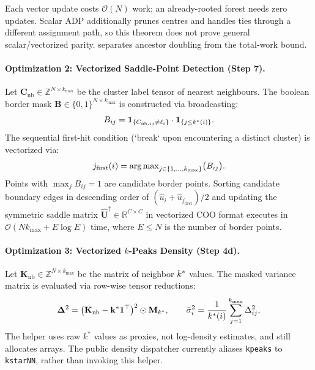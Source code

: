 Each vector update costs $\mathcal O(N)$ work; an already-rooted forest
needs zero updates. Scalar ADP additionally prunes centres and handles
ties through a different assignment path, so this theorem does not prove
general scalar/vectorized parity.  separates
ancestor doubling from the total-work bound.

\paragraph{Optimization 2: Vectorized Saddle-Point Detection (Step 7).}
Let $\mathbf{C}_{\mathrm{nb}} \in \mathbb{Z}^{N \times k_{\max}}$ be
the cluster label tensor of nearest neighbours. The boolean border
mask $\mathbf{B} \in \{0, 1\}^{N \times k_{\max}}$ is constructed
via broadcasting:
\begin{equation}
  B_{ij} = \mathbf{1}_{\{C_{\mathrm{nb}, ij} \ne \ell_i\}} \cdot
  \mathbf{1}_{\{j \le k^{*}(i)\}}.
  \label{eq:border_tensor}
\end{equation}
The sequential first-hit condition (`break` upon encountering a
distinct cluster) is vectorized via:
\begin{equation}
  j_{\mathrm{first}}(i) = \operatorname{arg\,max}_{j \in \{1, \dots, k_{\max}\}}
  \bigl( B_{ij} \bigr).
  \label{eq:vectorized_first_hit}
\end{equation}
Points with $\max_j B_{ij} = 1$ are candidate border points. Sorting
candidate boundary edges in descending order of
$(\hat u_i+\hat u_{j_{\mathrm{first}}})/2$ and updating the symmetric saddle
matrix $\hat{\mathbf{U}}^\dagger \in \mathbb{R}^{C \times C}$ in
vectorized COO format executes in $\mathcal{O}(N k_{\max} + E\log
E)$ time, where $E \le N$ is the number of border points.

\paragraph{Optimization 3: Vectorized $k$-Peaks Density (Step 4d).}
Let $\mathbf{K}_{\mathrm{nb}} \in \mathbb{Z}^{N \times k_{\max}}$ be
the matrix of neighbor $k^{*}$ values. The masked variance matrix
is evaluated via row-wise tensor reductions:
\begin{equation}
  \mathbf{\Delta}^2 = \bigl( \mathbf{K}_{\mathrm{nb}} -
  \mathbf{k}^* \mathbf{1}^\top \bigr)^2 \odot
  \mathbf{M}_{k^{*}}, \qquad \bar{\sigma}_i^2 =
  \frac{1}{k^{*}(i)}\sum_{j=1}^{k_{\max}} \Delta_{ij}^2,
  \label{eq:vectorized_kpeaks}
\end{equation}
The helper uses raw $k^*$ values as proxies, not log-density estimates,
and still allocates arrays. The public density dispatcher currently aliases
\texttt{kpeaks} to \texttt{kstarNN}, rather than invoking this helper.

